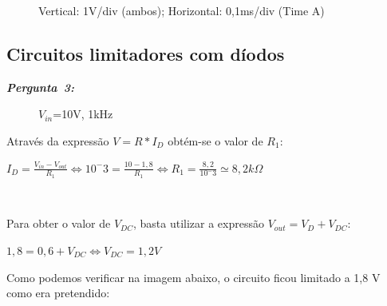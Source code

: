 \documentclass[pdftex,12pt,a4paper]{report}
\begin{document}
\begin{figure}[h]
\centerline{}
\caption{Vertical: 1V/div (ambos); Horizontal: 0,1ms/div (Time A)}\label{grafico_12_02_osciloscopio}
\end{figure}

\subsection{Circuitos limitadores com díodos}
\hbox{\emph{\textbf{Pergunta 3:}\newline}}

\begin{figure}[h]
\centerline{}
\caption{$V_{in}$=10V, 1kHz}\label{circuito13}
\end{figure}
Através da expressão $V = R*I_D$ obtém-se o valor de $R_1$:\newline
\centerline{$I_D = \frac{V_{in} - V_{out}}{R_1} \Leftrightarrow 10^-3 = \frac{10-1,8}{R_1} \Leftrightarrow R_1 = \frac{8,2}{10^-3} \simeq 8,2k\Omega$}\\
\vspace{0.1cm}

Para obter o valor de $V_{DC}$, basta utilizar a expressão $V_{out} = V_D + V_{DC}$:
\centerline{$ 1,8 = 0,6 + V_{DC} \Leftrightarrow V_{DC} = 1,2V$}

Como podemos verificar na imagem abaixo, o circuito ficou limitado a 1,8 V como era pretendido:
\end{document}
